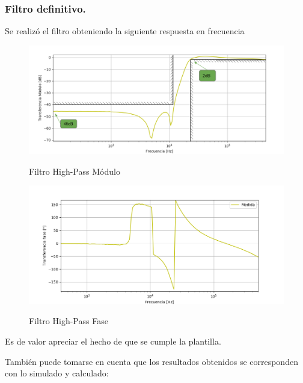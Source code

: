 \subsubsection{Filtro definitivo.}
Se realizó el filtro obteniendo la siguiente respuesta en frecuencia 
\begin{figure}[H]
	\centering
	\includegraphics[width=\textwidth]{Imagenes-Ej3/BodeSedra.png}
	\label{fig:BodeSedra}
	\caption{Filtro High-Pass Módulo}
\end{figure}
\begin{figure}[H]
	\centering
	\includegraphics[width=\textwidth]{Imagenes-Ej3/FaseBodeSedra.png}
	\label{fig:FaseBodeSedra}
	\caption{Filtro High-Pass Fase}
\end{figure}
Es de valor apreciar el hecho de que se cumple la plantilla.


También puede tomarse en cuenta que los resultados obtenidos se corresponden con lo simulado y calculado:

